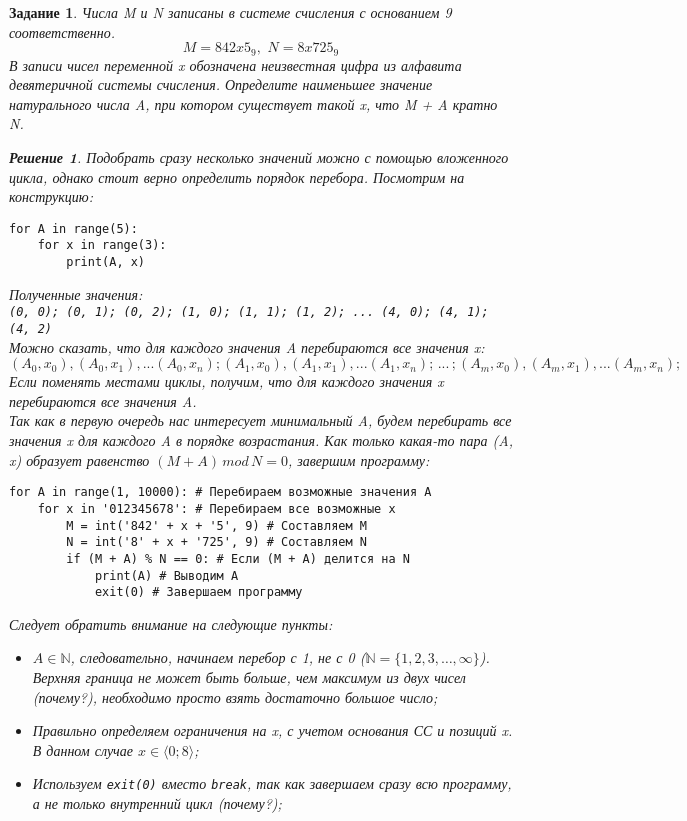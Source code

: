 \documentclass[12pt]{article}
\theoremstyle{problem_style}
\newtheorem{problem}{Задание}[subsection]
\newtheorem{solution}{Решение}[subsection]
\begin{document}
\begin{problem}
Числа M и N записаны в системе счисления с основанием 9 соответственно.
\[M = 842x5_9, \,\, N = 8x725_9\]
В записи чисел переменной x обозначена неизвестная цифра из алфавита девятеричной системы счисления. Определите наименьшее значение натурального числа A, при котором существует такой x, что M + A кратно N.
\begin{solution}
Подобрать сразу несколько значений можно с помощью вложенного цикла, однако стоит верно определить порядок перебора. Посмотрим на конструкцию:
\begin{verbatim}
for A in range(5):
    for x in range(3):
        print(A, x)
\end{verbatim}
Полученные значения:\\ \texttt{(0, 0); (0, 1); (0, 2); (1, 0); (1, 1); (1, 2); ... (4, 0); (4, 1); (4, 2)}\\
Можно сказать, что для каждого значения A перебираются все значения x: \[(A_0, x_0), (A_0, x_1), ... (A_0, x_n); (A_1, x_0), (A_1, x_1), ... (A_1, x_n);\,...\,; (A_m, x_0), (A_m, x_1), ... (A_m, x_n);\]
Если поменять местами циклы, получим, что для каждого значения x перебираются все значения A.\\
Так как в первую очередь нас интересует минимальный A, будем перебирать все значения x для каждого A в порядке возрастания. Как только какая-то пара (A, x) образует равенство $(M + A)\,mod\,N = 0$, завершим программу:
\begin{verbatim}
for A in range(1, 10000): # Перебираем возможные значения A
    for x in '012345678': # Перебираем все возможные x
        M = int('842' + x + '5', 9) # Составляем M
        N = int('8' + x + '725', 9) # Составляем N
        if (M + A) % N == 0: # Если (M + A) делится на N
            print(A) # Выводим А
            exit(0) # Завершаем программу
\end{verbatim}
Следует обратить внимание на следующие пункты:
\begin{itemize}
    \item $A \in \mathbb{N}$, следовательно, начинаем перебор с 1, не с 0 ($\mathbb{N}=\{1,2,3,\ldots,\infty\}$). Верхняя граница не может быть больше, чем максимум из двух чисел (почему?), необходимо просто взять достаточно большое число;
    \item Правильно определяем ограничения на x, с учетом основания СС и позиций x. В данном случае $x \in \langle 0; 8 \rangle$;
    \item Используем \texttt{exit(0)} вместо \texttt{break}, так как завершаем сразу всю программу, а не только внутренний цикл (почему?);
\end{itemize}
\end{solution}
\end{problem}
\end{document}
